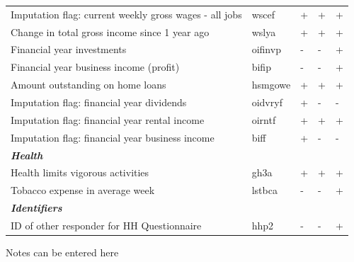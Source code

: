 \documentclass[12pt, a4paper]{article}
\begin{document}
\begin{landscape}
\begin{longtable}{p{} C{0.2\textwidth} C{0.2\textwidth} C{0.2\textwidth} C{0.2\textwidth}}
Imputation flag: current weekly gross wages - all jobs 	& 	wscef	 & 	+	 & 	+	 & 	+	\\
Change in total gross income since 1 year ago 	& 	wslya	 & 	+	 & 	+	 & 	+	\\
Financial year investments 	& 	oifinvp	 & 	-	 & 	-	 & 	+	\\
Financial year business income (profit) 	& 	bifip	 & 	-	 & 	-	 & 	+	\\
Amount outstanding on home loans 	& 	hsmgowe	 & 	+	 & 	+	 & 	+	\\
Imputation flag: financial year dividends 	& 	oidvryf	 & 	+	 & 	-	 & 	-	\\
Imputation flag: financial year rental income 	& 	oirntf	 & 	+	 & 	+	 & 	+	\\
Imputation flag: financial year business income 	& 	biff	 & 	+	 & 	-	 & 	-	\\
\textbf{\textit{Health}} 	& 		 & 		 & 		 & 		\\
Health limits vigorous activities 	& 	gh3a	 & 	+	 & 	+	 & 	+	\\
Tobacco expense in average week 	& 	lstbca	 & 	-	 & 	-	 & 	+	\\
\textbf{\textit{Identifiers}} 	& 		 & 		 & 		 & 		\\
ID of other responder for HH Questionnaire 	& 	hhp2	 & 	-	 & 	-	 & 	+	
\label{tab:mlvars}
\end{longtable}  
\parbox{1.5\textwidth}{\footnotesize *Notes can be entered here}\\            
      
      


\end{landscape}
\end{document}
